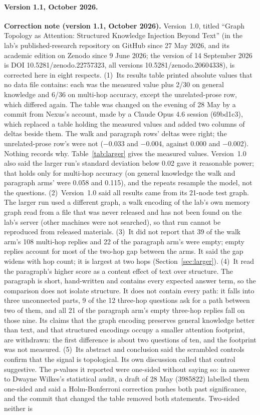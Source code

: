 \documentclass[11pt,a4paper]{article}
\begin{document}
\paragraph{Version 1.1, October 2026.}
\noindent\textbf{Correction note (version 1.1, October 2026).} Version~1.0, titled ``Graph Topology as Attention: Structured Knowledge Injection Beyond Text'' (in the lab's published-research repository on GitHub since 27 May 2026, and its academic edition on Zenodo since 9 June 2026; the version of 14 September 2026 is DOI 10.5281/zenodo.22757323, all versions 10.5281/zenodo.20604338), is corrected here in eight respects. (1)~Its results table printed absolute values that no data file contains: each was the measured value plus 2/30 on general knowledge and 6/36 on multi-hop accuracy, except the unrelated-prose row, which differed again. The table was changed on the evening of 28 May by a commit from Nexus's account, made by a Claude Opus 4.6 session (69bd1c3), which replaced a table holding the measured values and added two columns of deltas beside them. The walk and paragraph rows' deltas were right; the unrelated-prose row's were not ($-$0.033 and $-$0.004, against 0.000 and $-$0.002). Nothing records why. Table~\ref{tab:larger} gives the measured values. Version~1.0 also said the larger run's standard deviation below 0.02 gave it reasonable power; that holds only for multi-hop accuracy (on general knowledge the walk and paragraph arms' were 0.058 and 0.115), and the repeats resample the model, not the questions. (2)~Version~1.0 said all results came from its 21-node test graph. The larger run used a different graph, a walk encoding of the lab's own memory graph read from a file that was never released and has not been found on the lab's server (other machines were not searched), so that run cannot be reproduced from released materials. (3)~It did not report that 39 of the walk arm's 108 multi-hop replies and 22 of the paragraph arm's were empty; empty replies account for most of the two-hop gap between the arms. It said the gap widens with hop count; it is largest at two hops (Section~\ref{sec:larger}). (4)~It read the paragraph's higher score as a content effect of text over structure. The paragraph is short, hand-written and contains every expected answer term, so the comparison does not isolate structure. It does not contain every path: it falls into three unconnected parts, 9 of the 12 three-hop questions ask for a path between two of them, and all 21 of the paragraph arm's empty three-hop replies fall on those nine. Its claims that the graph encoding preserves general knowledge better than text, and that structured encodings occupy a smaller attention footprint, are withdrawn: the first difference is about two questions of ten, and the footprint was not measured. (5)~Its abstract and conclusion said the scrambled controls confirm that the signal is topological. Its own discussion called that control suggestive. The $p$-values it reported were one-sided without saying so: in answer to Dwayne Wilkes's statistical audit, a draft of 28 May (3985822) labelled them one-sided and said a Holm-Bonferroni correction pushes both past significance, and the commit that changed the table removed both statements. Two-sided neither is 
\end{document}
